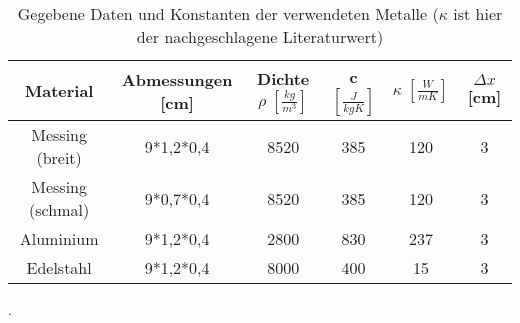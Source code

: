 \begin{table}[H]
  \centering
   \begin{tabular}{c c c c c c}
    \toprule
    Material & Abmessungen [cm] & Dichte $ \rho\; [\frac{kg}{m^3}]$ & c $[\frac{J}{kgK}]$
    & $\kappa\; [\frac{W}{mK}]$ & $\Delta x$ [cm]\\
    \midrule
    Messing (breit) & 9*1,2*0,4 & 8520 & 385 & 120 & 3\\
    Messing (schmal) & 9*0,7*0,4 & 8520 & 385 & 120 & 3\\
    Aluminium       & 9*1,2*0,4 & 2800 & 830 & 237 & 3 \\
    Edelstahl       & 9*1,2*0,4 & 8000 & 400 & 15 & 3 \\

    \bottomrule
  \end{tabular}
  \caption{Gegebene Daten und Konstanten der verwendeten Metalle
  ($\kappa$ ist hier der nachgeschlagene Literaturwert)}
  \cite{skript}
  \cite{chemie}.
  \label{tab:daten}
\end{table}
